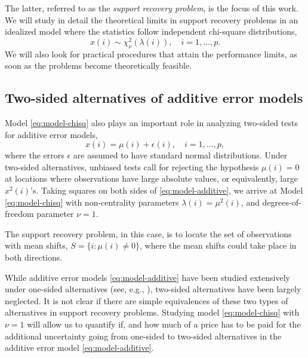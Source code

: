 The latter, referred to as the \emph{support recovery problem}, is the focus of this work.
We will study in detail the theoretical limits in support recovery problems in an idealized model where the statistics follow independent chi-square distributions,
\begin{equation} \label{eq:model-chisq}
    x(i) \sim \chi_\nu^2\left(\lambda(i)\right), \quad i=1,\ldots,p.
\end{equation}
We will also look for practical procedures that attain the performance limits, as soon as the problems become theoretically feasible.

\subsection{Two-sided alternatives of additive error models}
\label{subsec:motivation-additive}

Model \eqref{eq:model-chisq} also plays an important role in analyzing two-sided tests for additive error models,
\begin{equation} \label{eq:model-additive}
    x(i) = \mu(i) + \epsilon(i), \quad i=1,\ldots,p,
\end{equation}
where the errors $\epsilon$ are assumed to have standard normal distributions.
Under two-sided alternatives, unbiased tests call for rejecting the hypothesis $\mu(i)=0$ at locations where observations have large absolute values, or equivalently, large $x^2(i)$'s.
Taking squares on both sides of \eqref{eq:model-additive}, we arrive at Model \eqref{eq:model-chisq} with non-centrality parameters $\lambda(i) = \mu^2(i)$, and degrees-of-freedom parameter $\nu =1$.

The support recovery problem, in this case, is to locate the set of observations with mean shifts, $S=\{i:\mu(i)\neq 0\}$, where the mean shifts could take place in both directions.

While additive error models \eqref{eq:model-additive} have been studied extensively under one-sided alternatives (see, e.g., \cite{arias2017distribution, butucea2018variable, gao2018fundamental}), two-sided alternatives have been largely neglected.
It is not clear if there are simple equivalences of these two types of alternatives in support recovery problems.
Studying model \eqref{eq:model-chisq} with $\nu =1 $ will allow us to quantify if, and how much of a price has to be paid for the additional uncertainty going from one-sided to two-sided alternatives in the additive error model \eqref{eq:model-additive}.

